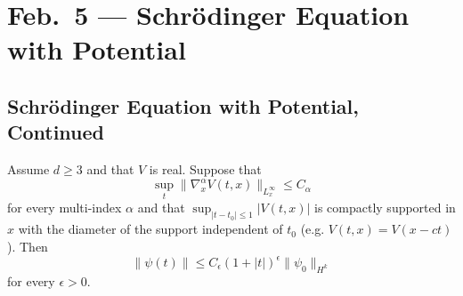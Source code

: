 \chapter{Feb.~5 --- Schr\"odinger Equation with Potential}

\section{Schr\"odinger Equation with Potential, Continued}

\begin{theorem}[Bourgain]
  Assume $d \ge 3$ and that $V$ is real. Suppose that
  \[
    \sup_{t} \| \nabla_x^\alpha V(t, x) \|_{L^\infty_x} \le C_\alpha
  \]
  for every multi-index $\alpha$ and that
  $\sup_{|t - t_0| \le 1} |V(t, x)|$ is compactly
  supported in $x$ with the diameter of the support
  independent of $t_0$ (e.g. $V(t, x) = V(x - ct)$).
  Then
  \[
    \|\psi(t)\| \le C_\epsilon (1 + |t|)^{\epsilon} \|\psi_0\|_{H^k}
  \]
  for every $\epsilon > 0$.
\end{theorem}

